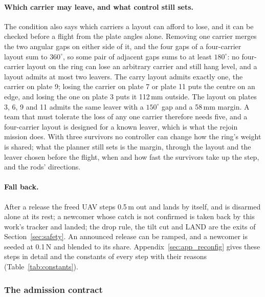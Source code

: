 \paragraph{Which carrier may leave, and what control still sets.} The condition also says which carriers a layout
can afford to lose, and it can be checked before a flight from the plate angles alone. Removing one carrier merges
the two angular gaps on either side of it, and the four gaps of a four-carrier layout sum to $360^\circ$, so some
pair of adjacent gaps sums to at least $180^\circ$: no four-carrier layout on the ring can lose an arbitrary
carrier and still hang level, and a layout admits at most two leavers. The carry layout admits exactly one, the
carrier on plate 9; losing the carrier on plate 7 or plate 11 puts the centre on an edge, and losing the one on plate
3 puts it 112\,mm outside. The layout on plates 3, 6, 9 and 11 admits the same leaver with a $150^\circ$ gap and a
58\,mm margin. A team that must tolerate the loss of any one carrier therefore needs five, and a four-carrier layout
is designed for a known leaver, which is what the rejoin mission does.
With three survivors no controller can change how the
ring's weight is shared; what the planner still sets is the margin, through the layout and the leaver chosen before
the flight, when and how fast the survivors take up the step, and the rods' directions.

\paragraph{Fall back.} After a release the freed UAV steps 0.5\,m out and lands by itself, and is disarmed alone at
its rest; a newcomer whose catch is not confirmed is taken back by this work's tracker and landed; the drop rule, the
tilt cut and LAND are the exits of Section~\ref{sec:safety}. An announced release can be ramped, and a newcomer is
seeded at 0.1\,N and blended to its share. Appendix~\ref{sec:app_reconfig} gives these steps in detail and the constants
of every step with their reasons (Table~\ref{tab:constants}).

\subsubsection{The admission contract}
\label{sec:admission}

